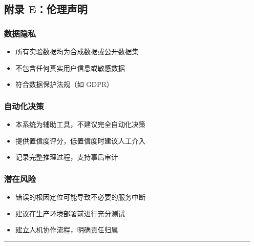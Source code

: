 \hypertarget{ux9644ux5f55-eux4f26ux7406ux58f0ux660e}{%
\subsection{附录
E：伦理声明}\label{ux9644ux5f55-eux4f26ux7406ux58f0ux660e}}

\hypertarget{ux6570ux636eux9690ux79c1}{%
\subsubsection{数据隐私}\label{ux6570ux636eux9690ux79c1}}

\begin{itemize}
\tightlist
\item
  所有实验数据均为合成数据或公开数据集
\item
  不包含任何真实用户信息或敏感数据
\item
  符合数据保护法规（如 GDPR）
\end{itemize}

\hypertarget{ux81eaux52a8ux5316ux51b3ux7b56}{%
\subsubsection{自动化决策}\label{ux81eaux52a8ux5316ux51b3ux7b56}}

\begin{itemize}
\tightlist
\item
  本系统为辅助工具，不建议完全自动化决策
\item
  提供置信度评分，低置信度时建议人工介入
\item
  记录完整推理过程，支持事后审计
\end{itemize}

\hypertarget{ux6f5cux5728ux98ceux9669}{%
\subsubsection{潜在风险}\label{ux6f5cux5728ux98ceux9669}}

\begin{itemize}
\tightlist
\item
  错误的根因定位可能导致不必要的服务中断
\item
  建议在生产环境部署前进行充分测试
\item
  建立人机协作流程，明确责任归属
\end{itemize}

\begin{center}\rule{0.5\linewidth}{0.5pt}\end{center}

